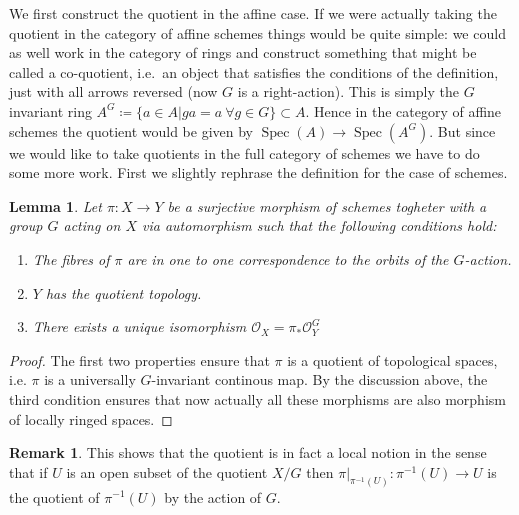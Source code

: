\documentclass[11pt, a4paper, german]{article}
\theoremstyle{plain}
\newtheorem{lemma}[theorem]{Lemma}
\theoremstyle{definition}
\newtheorem{remark}[theorem]{Remark}
\DeclareMathOperator{\Spec}{Spec}
\begin{document}
We first construct the quotient in the affine case. If we were actually taking the quotient in the category of affine schemes things would be
quite simple: we could as well work in the category of rings and construct something that might be called a co-quotient, i.e.\ an object that
satisfies the conditions of the definition, just with all arrows reversed (now $G$ is a right-action). This is simply the $G$ invariant ring
$A^G \coloneqq \{a \in A | ga = a \ \forall g \in G\} \subset A$. Hence in the category of affine schemes the quotient would be given by 
$\Spec(A) \to \Spec(A^G)$. But since we would like to take quotients in the full category of schemes we have to do some more work.
First we slightly rephrase the definition for the case of schemes.
\begin{lemma}
    \label{quotProps}
    Let $\pi \colon X \to Y$ be a surjective morphism of schemes togheter with a group $G$ acting on $X$ via automorphism 
    such that the following conditions hold:
    \begin{enumerate}[label=\rm{\roman*)}]
        \item The fibres of $\pi$ are in one to one correspondence to the orbits of the $G$-action.
        \item $Y$ has the quotient topology.
        \item There exists a unique isomorphism $\mathcal{O}_X = \pi_*\mathcal{O}_Y^G$
    \end{enumerate}
\end{lemma}
\begin{proof}
    The first two properties ensure that $\pi$ is a quotient of topological spaces, i.e. $\pi$ is a universally $G$-invariant continous map.
    By the discussion above, the third condition ensures that now actually all these morphisms are also morphism of locally ringed spaces.
\end{proof}

\begin{remark}
    \label{quotLocal}
    This shows that the quotient is in fact a local notion in the sense that if $U$ is an open subset of the quotient $X/G$ 
    then $\pi|_{\pi^{-1}(U)} \colon \pi^{-1}(U) \to U$ is the quotient of $\pi^{-1}(U)$ by the action of $G$.
\end{remark}
\end{document}
